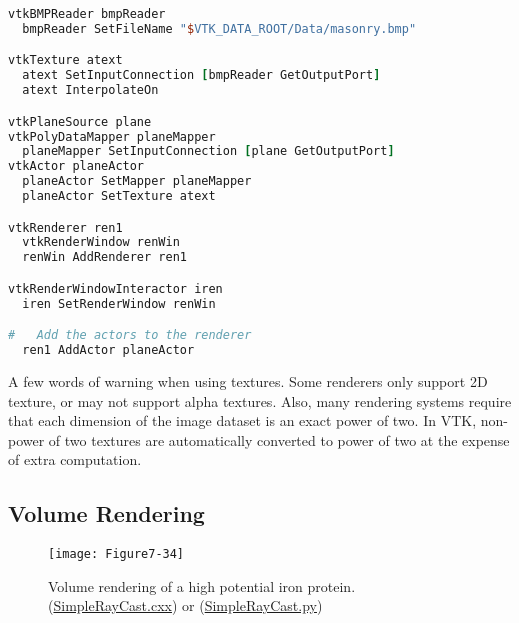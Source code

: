 \begin{lstlisting}[language=TCL, caption={Example of texture mapping.}]
vtkBMPReader bmpReader
  bmpReader SetFileName "$VTK_DATA_ROOT/Data/masonry.bmp"

vtkTexture atext
  atext SetInputConnection [bmpReader GetOutputPort]
  atext InterpolateOn

vtkPlaneSource plane
vtkPolyDataMapper planeMapper
  planeMapper SetInputConnection [plane GetOutputPort]
vtkActor planeActor
  planeActor SetMapper planeMapper
  planeActor SetTexture atext

vtkRenderer ren1
  vtkRenderWindow renWin
  renWin AddRenderer ren1

vtkRenderWindowInteractor iren
  iren SetRenderWindow renWin

#   Add the actors to the renderer
  ren1 AddActor planeActor
\end{lstlisting}

A few words of warning when using textures. Some renderers only support 2D texture, or may not support alpha textures. Also, many rendering systems require that each dimension of the image dataset is an exact power of two. In VTK, non-power of two textures are automatically converted to power of two at the expense of extra computation.

\subsection{Volume Rendering}

\begin{wrapfigure}{R}{0.4\textwidth}
	\centering
	\texttt{[image: Figure7-34]}
	\caption{Volume rendering of a high potential iron protein.(\href{https://lorensen.github.io/VTKExamples/site/Cxx/VolumeRendering/SimpleRayCast/}{SimpleRayCast.cxx}) or (\href{https://lorensen.github.io/VTKExamples/site/Python/VolumeRendering/SimpleRayCast/}{SimpleRayCast.py})}
	\label{fig:Figure7-34}
\end{wrapfigure}

